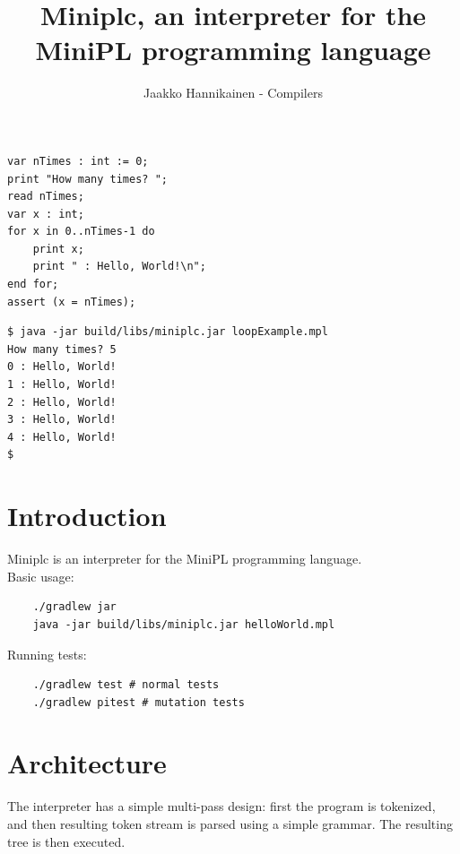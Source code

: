 \documentclass{article}
\author{Jaakko Hannikainen - Compilers}
\title{Miniplc, an interpreter for the MiniPL programming language}
\begin{document}
\maketitle

\noindent
\begin{minipage}{0.49\textwidth}
\begin{verbatim}
var nTimes : int := 0;
print "How many times? ";
read nTimes;
var x : int;
for x in 0..nTimes-1 do
    print x;
    print " : Hello, World!\n";
end for;
assert (x = nTimes);
\end{verbatim}
\end{minipage}
\begin{minipage}{0.49\textwidth}
\begin{verbatim}
$ java -jar build/libs/miniplc.jar loopExample.mpl
How many times? 5
0 : Hello, World!
1 : Hello, World!
2 : Hello, World!
3 : Hello, World!
4 : Hello, World!
$
\end{verbatim}
\end{minipage}

\vfill

\section{Introduction}
Miniplc is an interpreter for the MiniPL programming language. \\[1.5em]

\noindent
Basic usage:
\begin{verbatim}
    ./gradlew jar
    java -jar build/libs/miniplc.jar helloWorld.mpl
\end{verbatim}

\noindent
Running tests:
\begin{verbatim}
    ./gradlew test # normal tests
    ./gradlew pitest # mutation tests
\end{verbatim}

\vfill

\newpage
\section{Architecture}
\label{sec:architecture}
The interpreter has a simple multi-pass design: first the program is tokenized,
and then resulting token stream is parsed using a simple grammar. The resulting
tree is then executed.
\end{document}
